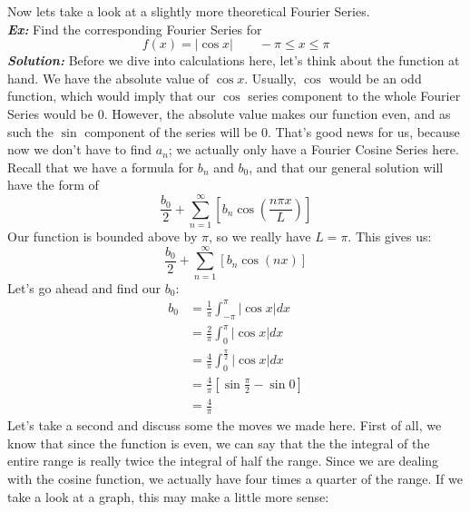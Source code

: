 \documentclass{article}
\begin{document}
\newpage
\indent Now lets take a look at a slightly more theoretical Fourier Series.\\
\noindent\textbf{\textit{Ex:}} Find the corresponding Fourier Series for\\
\[f(x)=\left|\cos{x}\right|\qquad -\pi\leq x \leq \pi\]
\indent\textbf{\textit{Solution:}} Before we dive into calculations here, let's think about the function at hand. We have the absolute value of $\cos{x}$. Usually, $\cos$ would be an odd function, which would imply that our $\cos$ series component to the whole Fourier Series would be $0$. However, the absolute value makes our function even, and as such the $\sin$ component of the series will be $0$. That's good news for us, because now we don't have to find $a_{n}$; we actually only have a Fourier Cosine Series here. Recall that we have a formula for $b_{n}$ and $b_{0}$, and that our general solution will have the form of
\[\frac{b_{0}}{2} + \sum_{n=1}^{\infty}[b_{n}\cos{\left(\frac{n\pi x}{L}\right)}]\]
\noindent Our function is bounded above by $\pi$, so we really have $L= \pi$. This gives us:
\[\frac{b_{0}}{2} + \sum_{n=1}^{\infty}[b_{n}\cos{\left(nx\right)}]\]
\noindent Let's go ahead and find our $b_{0}$:
\begin{align*}
b_{0} &= \frac{1}{\pi}\int_{-\pi}^{\pi}\left|\cos{x}\right|dx\\
&= \frac{2}{\pi}\int_{0}^{\pi}\left|\cos{x}\right|dx\\
&= \frac{4}{\pi}\int_{0}^{\frac{\pi}{2}}\left|\cos{x}\right|dx\\
&= \frac{4}{\pi}\left[\sin{\frac{\pi}{2}} - \sin{0}\right]\\
&= \frac{4}{\pi}
\end{align*}
\noindent Let's take a second and discuss some the moves we made here. First of all, we know that since the function is even, we can say that the the integral of the entire range is really twice the integral of half the range. Since we are dealing with the cosine function, we actually have four times a quarter of the range. If we take a look at a graph, this may make a little more sense:\\
\end{document}
